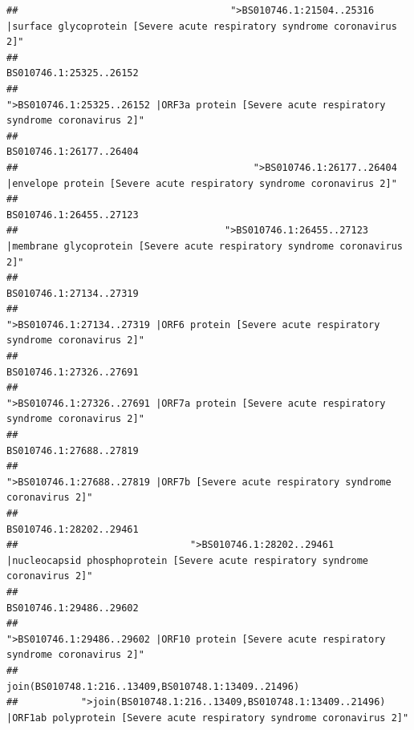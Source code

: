 \documentclass[
]{article}
\begin{document}
\begin{verbatim}
##                                     ">BS010746.1:21504..25316 |surface glycoprotein [Severe acute respiratory syndrome coronavirus 2]" 
##                                                                                                                BS010746.1:25325..26152 
##                                            ">BS010746.1:25325..26152 |ORF3a protein [Severe acute respiratory syndrome coronavirus 2]" 
##                                                                                                                BS010746.1:26177..26404 
##                                         ">BS010746.1:26177..26404 |envelope protein [Severe acute respiratory syndrome coronavirus 2]" 
##                                                                                                                BS010746.1:26455..27123 
##                                    ">BS010746.1:26455..27123 |membrane glycoprotein [Severe acute respiratory syndrome coronavirus 2]" 
##                                                                                                                BS010746.1:27134..27319 
##                                             ">BS010746.1:27134..27319 |ORF6 protein [Severe acute respiratory syndrome coronavirus 2]" 
##                                                                                                                BS010746.1:27326..27691 
##                                            ">BS010746.1:27326..27691 |ORF7a protein [Severe acute respiratory syndrome coronavirus 2]" 
##                                                                                                                BS010746.1:27688..27819 
##                                                    ">BS010746.1:27688..27819 |ORF7b [Severe acute respiratory syndrome coronavirus 2]" 
##                                                                                                                BS010746.1:28202..29461 
##                              ">BS010746.1:28202..29461 |nucleocapsid phosphoprotein [Severe acute respiratory syndrome coronavirus 2]" 
##                                                                                                                BS010746.1:29486..29602 
##                                            ">BS010746.1:29486..29602 |ORF10 protein [Severe acute respiratory syndrome coronavirus 2]" 
##                                                                                    join(BS010748.1:216..13409,BS010748.1:13409..21496) 
##           ">join(BS010748.1:216..13409,BS010748.1:13409..21496) |ORF1ab polyprotein [Severe acute respiratory syndrome coronavirus 2]" 

\end{verbatim}
\end{document}
